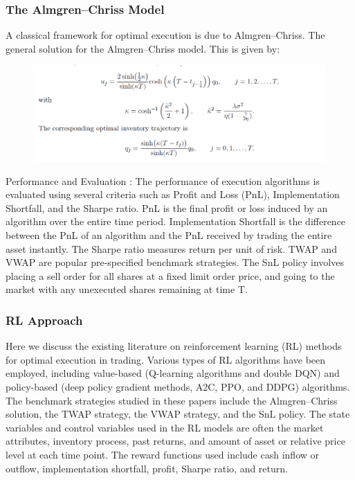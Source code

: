 \documentclass{article}
\begin{document}
\subsubsection{The Almgren–Chriss Model}
A classical framework for optimal execution is due to Almgren–Chriss. The general solution for the Almgren–Chriss model. This is given by:
\begin{figure}[H]
\begin{center}
\includegraphics[scale = 0.5]{Stoc3.png}
\end{center}
\end{figure}

Performance and Evaluation : The performance of execution algorithms is evaluated using several criteria such as Profit and Loss (PnL), Implementation Shortfall, and the Sharpe ratio. PnL is the final profit or loss induced by an algorithm over the entire time period. Implementation Shortfall is the difference between the PnL of an algorithm and the PnL received by trading the entire asset instantly. The Sharpe ratio measures return per unit of risk. TWAP and VWAP are popular pre-specified benchmark strategies. The SnL policy involves placing a sell order for all shares at a fixed limit order price, and going to the market with any unexecuted shares remaining at time T.

\subsubsection{RL Approach}
Here we discuss the existing literature on reinforcement learning (RL) methods for optimal execution in trading. Various types of RL algorithms have been employed, including value-based (Q-learning algorithms and double DQN) and policy-based (deep policy gradient methods, A2C, PPO, and DDPG) algorithms. The benchmark strategies studied in these papers include the Almgren–Chriss solution, the TWAP strategy, the VWAP strategy, and the SnL policy. The state variables and control variables used in the RL models are often the market attributes, inventory process, past returns, and amount of asset or relative price level at each time point. The reward functions used include cash inflow or outflow, implementation shortfall, profit, Sharpe ratio, and return.
\end{document}
